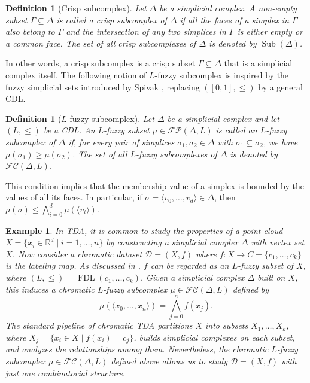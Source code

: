 \documentclass[a4paper,10pt]{article}
\newtheorem{definition}[theorem]{Definition}
\newtheorem{example}[theorem]{Example}
\newcommand{\bbr}{\mathbb{R}}
\newcommand{\calfp}{\mathcal{FP}}
\newcommand{\calfc}{\mathcal{FC}}
\DeclareMathOperator{\fdl}{FDL}
\DeclareMathOperator{\sub}{Sub}
\begin{document}
\begin{definition}[Crisp subcomplex]
\label{def:subcomplex}
Let \(\Delta\) be a simplicial complex. A non-empty subset \(\Gamma \subseteq \Delta\) is called a \emph{crisp subcomplex} of \(\Delta\) if all the faces of a simplex in \(\Gamma\) also belong to \(\Gamma\) and the intersection of any two simplices in \(\Gamma\) is either empty or a common face. The set of all crisp subcomplexes of \(\Delta\) is denoted by \(\sub(\Delta)\).
\end{definition}

In other words, a crisp subcomplex is a crisp subset \(\Gamma \subseteq \Delta\) that is a simplicial complex itself. The following notion of \(L\)-fuzzy subcomplex is inspired by the fuzzy simplicial sets introduced by Spivak \cite{spivak2009metric}, replacing \(([0,1],\leq)\) by a general CDL.

\begin{definition}[\(L\)-fuzzy subcomplex]
\label{def:lfuzzysubcomplex}
Let \(\Delta\) be a simplicial complex and let \((L,\leq)\) be a CDL. An \(L\)-fuzzy subset \(\mu \in \calfp(\Delta,L)\) is called an \emph{\(L\)-fuzzy subcomplex} of \(\Delta\) if, for every pair of simplices \(\sigma_1, \sigma_2 \in \Delta\) with \(\sigma_1 \subseteq \sigma_2\), we have \(\mu(\sigma_1) \geq \mu(\sigma_2)\). The set of all \(L\)-fuzzy subcomplexes of \(\Delta\) is denoted by \(\calfc(\Delta,L)\).
\end{definition}

This condition implies that the membership value of a simplex is bounded by the values of all its faces. In particular, if \(\sigma = \langle v_0,\ldots,v_d \rangle \in \Delta\), then \(\mu(\sigma) \leq \bigwedge_{i=0}^d \mu(\langle v_i \rangle)\). 

\begin{example}
\label{exa:chroTDA}
In TDA, it is common to study the properties of a point cloud \(X = \{x_i \in \bbr^d \mid i=1,\dots,n\}\) by constructing a simplicial complex \(\Delta\) with vertex set \(X\). Now consider a chromatic dataset \(\mathcal{D} = (X,f)\) where \(f: X \to C=\{c_1,\dots,c_k\}\) is the labeling map. As discussed in , \(f\) can be regarded as an \(L\)-fuzzy subset of \(X\), where \((L,\le)=\fdl(c_1,\dots,c_k)\). Given a simplicial complex \(\Delta\) built on \(X\), this induces a chromatic \(L\)-fuzzy subcomplex \(\mu \in \calfc(\Delta,L)\) defined by
\[
\mu(\langle x_0,\dots,x_n\rangle) = \bigwedge_{j=0}^{n} f(x_j).
\]
The standard pipeline of chromatic TDA partitions \(X\) into subsets \(X_1,\dots,X_k\), where \(X_j = \{x_i \in X \mid f(x_i)=c_j\}\), builds simplicial complexes on each subset, and analyzes the relationships among them. Nevertheless, the chromatic \(L\)-fuzzy subcomplex \(\mu \in \calfc(\Delta,L)\) defined above allows us to study \(\mathcal{D} = (X,f)\) with just one combinatorial structure.
\end{example}
\end{document}
